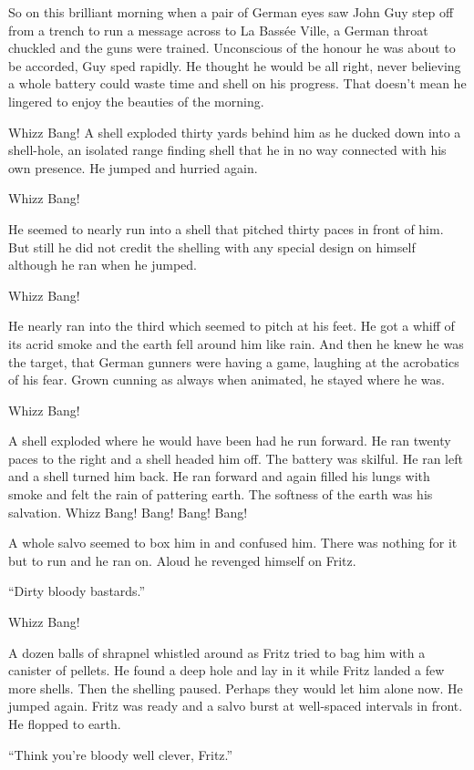 So on this brilliant morning when a pair of German eyes saw John Guy step off from a trench to run a message across to La Bass\'{e}e Ville, a German throat chuckled and the guns were trained. Unconscious of the honour he was about to be accorded, Guy sped rapidly. He thought he would be all right, never believing a whole battery could waste time and shell on his progress. That doesn't mean he lingered to enjoy the beauties of the morning.

Whizz Bang! A shell exploded thirty yards behind him as he ducked down into a shell-hole, an isolated range finding shell that he in no way connected with his own presence. He jumped and hurried again.

Whizz Bang!

He seemed to nearly run into a shell that pitched thirty paces in front of him. But still he did not credit the shelling with any special design on himself although he ran when he jumped.

Whizz Bang!

He nearly ran into the third which seemed to pitch at his feet. He got a whiff of its acrid smoke and the earth fell around him like rain. And then he knew he was the target, that German gunners were having a game, laughing at the acrobatics of his fear. Grown cunning as always when animated, he stayed where he was.

Whizz Bang!

A shell exploded where he would have been had he run forward. He ran twenty paces to the right and a shell headed him off. The battery was skilful. He ran left and a shell turned him back. He ran forward and again filled his lungs with smoke and felt the rain of pattering earth. The softness of the earth was his salvation. Whizz Bang! Bang! Bang! Bang!

A whole salvo seemed to box him in and confused him. There was nothing for it but to run and he ran on. Aloud he revenged himself on Fritz.

``Dirty bloody bastards.''

Whizz Bang!

A dozen balls of shrapnel whistled around as Fritz tried to bag him with a canister of pellets. He found a deep hole and lay in it while Fritz landed a few more shells. Then the shelling paused. Perhaps they would let him alone now. He jumped again. Fritz was ready and a salvo burst at well-spaced intervals in front. He flopped to earth.

``Think you're bloody well clever, Fritz.''

